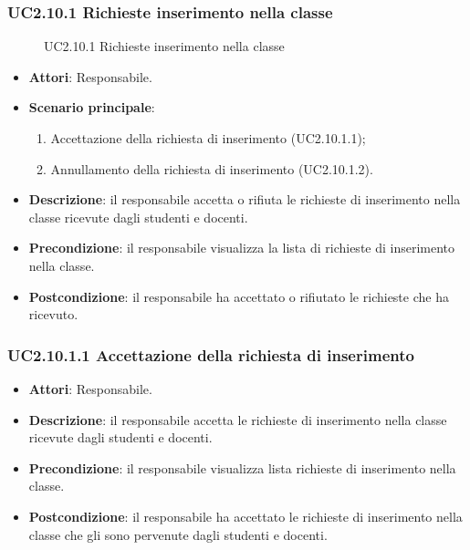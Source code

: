\subsubsection{UC2.10.1 Richieste inserimento nella classe}
\begin{figure}[H]
\centering
\noindent{}
\caption{UC2.10.1 Richieste inserimento nella classe}
\end{figure}
\begin{itemize}
\item \textbf{Attori}: Responsabile.
\item \textbf{Scenario principale}:
\begin{enumerate}
\item Accettazione della richiesta di inserimento (UC2.10.1.1);
\item Annullamento della richiesta di inserimento (UC2.10.1.2).
\end{enumerate}
\item \textbf{Descrizione}: il responsabile accetta o rifiuta le richieste di inserimento nella classe ricevute dagli studenti e docenti.
\item \textbf{Precondizione}: il responsabile visualizza la lista di richieste di inserimento nella classe.
\item \textbf{Postcondizione}: il responsabile ha accettato o rifiutato le richieste che ha ricevuto.
\end{itemize}
\subsubsection{UC2.10.1.1 Accettazione della richiesta di inserimento}
\begin{itemize}
\item \textbf{Attori}: Responsabile.
\item \textbf{Descrizione}: il responsabile accetta le richieste di inserimento nella classe ricevute dagli studenti e docenti.
\item \textbf{Precondizione}: il responsabile visualizza lista richieste di inserimento nella classe.
\item \textbf{Postcondizione}: il responsabile ha accettato le richieste di inserimento nella classe che gli sono pervenute dagli studenti e docenti.
\end{itemize}

